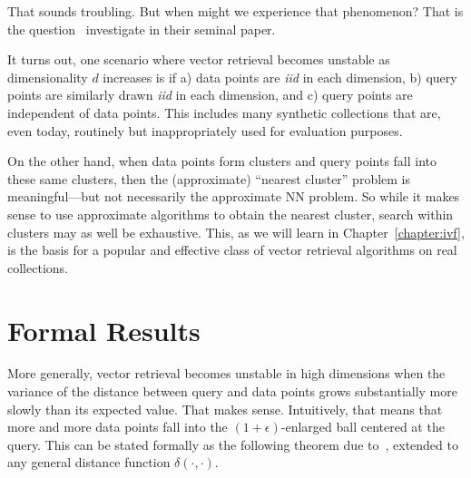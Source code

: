 That sounds troubling. But when might we experience that phenomenon? That is the
question~\cite{beyer1999nnMeaningful} investigate in their seminal paper.

\begin{svgraybox}
It turns out, one scenario where vector retrieval becomes unstable as dimensionality $d$ increases is
if a) data points are \emph{iid} in each dimension,
b) query points are similarly drawn \emph{iid} in each dimension, and
c) query points are independent of data points. This includes many
synthetic collections that are, even today, routinely but inappropriately used
for evaluation purposes.
\end{svgraybox}

On the other hand, when data points form clusters and query points
fall into these same clusters, then the (approximate) ``nearest cluster''
problem is meaningful---but not necessarily the approximate NN problem.
So while it makes sense to use approximate algorithms to obtain the nearest
cluster, search within clusters may as well be exhaustive.
This, as we will learn in Chapter~\ref{chapter:ivf},
is the basis for a popular and effective class of vector retrieval
algorithms on real collections.

\section{Formal Results}
More generally, vector retrieval becomes unstable in high dimensions
when the variance of the distance between query and data
points grows substantially more slowly than its expected value.
That makes sense. Intuitively, that means that more and more data points
fall into the $(1 + \epsilon)$-enlarged ball centered at the query.
This can be stated formally as the following theorem due to~\cite{beyer1999nnMeaningful},
extended to any general distance function $\delta(\cdot, \cdot)$.

